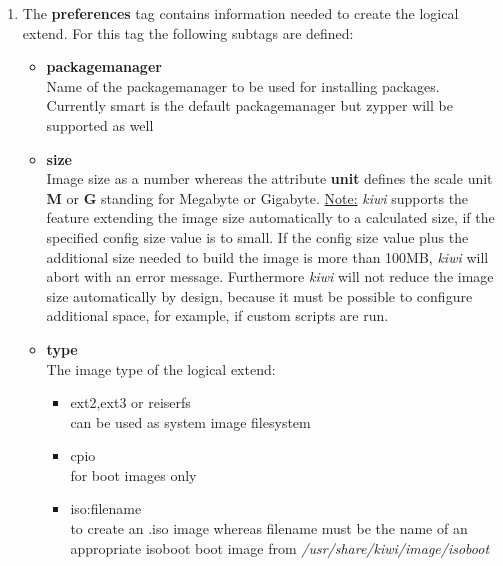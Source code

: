 \begin{itemize}
      \begin{enumerate}
          \item The \textbf{preferences} tag contains information needed to
          create the logical extend. For this tag the following subtags
          are defined:
          \begin{itemize}
              \item \textbf{packagemanager}\\
                    Name of the packagemanager to be used for installing
                    packages. Currently smart is the default packagemanager
                    but zypper will be supported as well
              \item \textbf{size}\\
                    Image size as a number whereas the attribute
                    \textbf{unit} defines the scale unit \textbf{M} or
                    \textbf{G} standing for Megabyte or Gigabyte.
                    \underline{Note:}
                    \textit{kiwi} supports the feature extending the image size
                    automatically to a calculated size, if the specified
                    config size value is to small. If the config size value
                    plus the additional size needed to build the image is more
                    than 100MB, \textit{kiwi} will abort with an error message.
                    Furthermore \textit{kiwi} will not reduce the image size
                    automatically by design, because it must be possible to
                    configure additional space, for example, if custom scripts
                    are run.
              \item \textbf{type}\\
                    The image type of the logical extend:
					\begin{itemize}
						\item ext2,ext3 or reiserfs\\
                              can be used as system image filesystem
						\item cpio\\
                              for boot images only
                        \item iso:filename\\
                              to create an .iso image whereas filename
                              must be the name of an appropriate isoboot
                              boot image from
                              \textit{/usr/share/kiwi/image/isoboot}

\end{itemize}
\end{itemize}
\end{enumerate}
\end{itemize}

